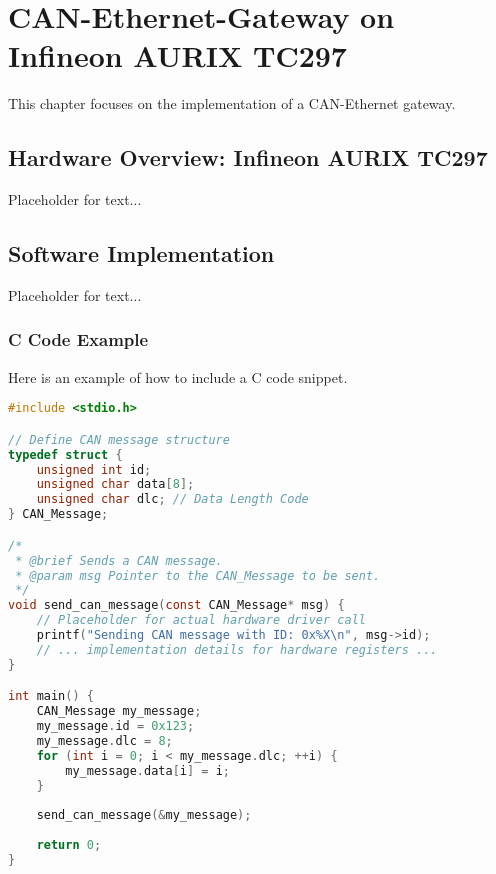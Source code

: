 \section{CAN-Ethernet-Gateway on Infineon AURIX TC297}
\label{sec:can-gateway}

This chapter focuses on the implementation of a CAN-Ethernet gateway.

\subsection{Hardware Overview: Infineon AURIX TC297}
Placeholder for text...

\subsection{Software Implementation}
Placeholder for text...

\subsubsection{C Code Example}
Here is an example of how to include a C code snippet.







\begin{lstlisting}[language=C, caption={Example of a simple CAN message sending function.}, label={lst:can_send}]
#include <stdio.h>

// Define CAN message structure
typedef struct {
    unsigned int id;
    unsigned char data[8];
    unsigned char dlc; // Data Length Code
} CAN_Message;

/*
 * @brief Sends a CAN message.
 * @param msg Pointer to the CAN_Message to be sent.
 */
void send_can_message(const CAN_Message* msg) {
    // Placeholder for actual hardware driver call
    printf("Sending CAN message with ID: 0x%X\n", msg->id);
    // ... implementation details for hardware registers ...
}

int main() {
    CAN_Message my_message;
    my_message.id = 0x123;
    my_message.dlc = 8;
    for (int i = 0; i < my_message.dlc; ++i) {
        my_message.data[i] = i;
    }
    
    send_can_message(&my_message);
    
    return 0;
}
\end{lstlisting}